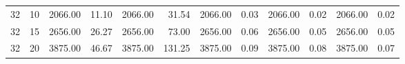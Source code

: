 \begin{table}
\begin{tabular}{@{}rrrrrrrrrrrr@{}}
32                                                                               & 10                                                                                    & 2066.00                                                                     & 11.10                                                                  & 2066.00                                                                     & 31.54                                                                   & 2066.00                                                                     & 0.03                                                                   & 2066.00                                                                     & 0.02                                                                   & 2066.00                                                                     & 0.02                                                                   \\
32                                                                               & 15                                                                                    & 2656.00                                                                     & 26.27                                                                  & 2656.00                                                                     & 73.00                                                                   & 2656.00                                                                     & 0.06                                                                   & 2656.00                                                                     & 0.05                                                                   & 2656.00                                                                     & 0.05                                                                   \\
32                                                                               & 20                                                                                    & 3875.00                                                                     & 46.67                                                                  & 3875.00                                                                     & 131.25                                                                  & 3875.00                                                                     & 0.09                                                                   & 3875.00                                                                     & 0.08                                                                   & 3875.00                                                                     & 0.07                                                                   \\

\end{tabular}
\end{table}
